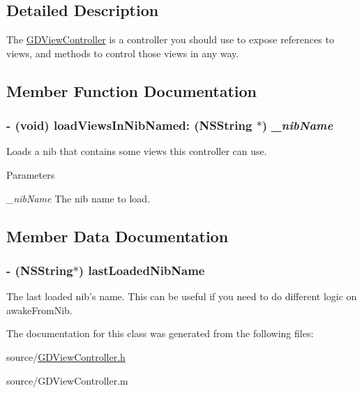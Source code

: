 \subsection{Detailed Description}
The \hyperlink{interface_g_d_view_controller}{GDViewController} is a controller you should use to expose references to views, and methods to control those views in any way. 

\subsection{Member Function Documentation}
\hypertarget{interface_g_d_view_controller_a03b39c29a143a38b171dcf311384e4df}{
\subsubsection[{loadViewsInNibNamed:}]{\setlength{\rightskip}{0pt plus 5cm}-\/ (void) loadViewsInNibNamed: ({\bf NSString} $\ast$) {\em \_\-nibName}}}
\label{interface_g_d_view_controller_a03b39c29a143a38b171dcf311384e4df}


Loads a nib that contains some views this controller can use. 
\begin{DoxyParams}{Parameters}
\item[{\em \_\-nibName}]The nib name to load. \end{DoxyParams}


\subsection{Member Data Documentation}
\hypertarget{interface_g_d_view_controller_a46123f01096710058753b5e97c70e6ab}{
\subsubsection[{lastLoadedNibName}]{\setlength{\rightskip}{0pt plus 5cm}-\/ ({\bf NSString}$\ast$) {\bf lastLoadedNibName}}}
\label{interface_g_d_view_controller_a46123f01096710058753b5e97c70e6ab}


The last loaded nib's name. This can be useful if you need to do different logic on awakeFromNib. 

The documentation for this class was generated from the following files:\begin{DoxyCompactItemize}
\item 
source/\hyperlink{_g_d_view_controller_8h}{GDViewController.h}\item 
source/GDViewController.m\end{DoxyCompactItemize}
